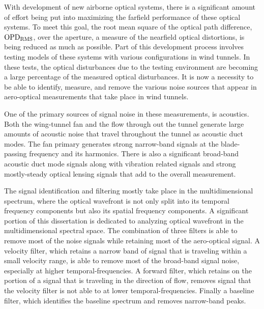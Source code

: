 
With development of new airborne optical systems, there is a significant amount of effort being put into maximizing the farfield performance of these optical systems.
To meet this goal, the root mean square of the optical path difference, $\operatorname{OPD_{RMS}}$, over the aperture, a measure of the nearfield optical distortions, is being reduced as much as possible.
Part of this development process involves testing models of these systems with various configurations in wind tunnels.
In these tests, the optical disturbances due to the testing environment are becoming a large percentage of the measured optical disturbances.
It is now a necessity to be able to identify, measure, and remove the various noise sources that appear in aero-optical measurements that take place in wind tunnels.

One of the primary sources of signal noise in these measurements, is acoustics.
Both the wing-tunnel fan and the flow through out the tunnel generate large amounts of acoustic noise that travel throughout the tunnel as acoustic duct modes.
The fan primary generates strong narrow-band signals at the blade-passing frequency and its harmonics.
There is also a significant broad-band acoustic duct mode signals along with vibration related signals and strong mostly-steady optical lensing signals that add to the overall measurement.

The signal identification and filtering mostly take place in the multidimensional spectrum, where the optical wavefront is not only split into its temporal frequency components but also its spatial frequency components.
A significant portion of this dissertation is dedicated to analyzing optical wavefront in the multidimensional spectral space.
The combination of three filters is able to remove most of the noise signals while retaining most of the aero-optical signal.
A velocity filter, which retains a narrow band of signal that is traveling within a small velocity range, is able to remove most of the broad-band signal noise, especially at higher temporal-frequencies.
A forward filter, which retains on the portion of a signal that is traveling in the direction of flow, removes signal that the velocity filter is not able to at lower temporal-frequencies.
Finally a baseline filter, which identifies the baseline spectrum and removes narrow-band peaks.
